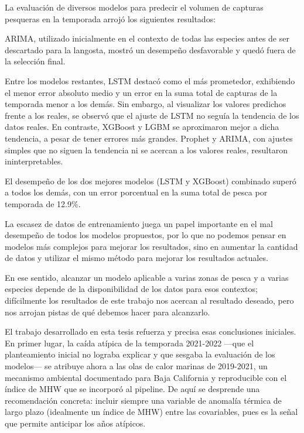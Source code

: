 La evaluación de diversos modelos para predecir el volumen de capturas pesqueras en la temporada arrojó los siguientes resultados:

ARIMA, utilizado inicialmente en el contexto de todas las especies antes de ser descartado para la langosta, mostró un desempeño desfavorable y quedó fuera de la selección final.

Entre los modelos restantes, LSTM destacó como el más prometedor, exhibiendo el menor error absoluto medio y un error en la suma total de capturas de la temporada menor a los demás. Sin embargo, al visualizar los valores predichos frente a los reales, se observó que el ajuste de LSTM no seguía la tendencia de los datos reales. En contraste, XGBoost y LGBM se aproximaron mejor a dicha tendencia, a pesar de tener errores más grandes. Prophet y ARIMA, con ajustes simples que no siguen la tendencia ni se acercan a los valores reales, resultaron ininterpretables. 

El desempeño de los dos mejores modelos (LSTM y XGBoost) combinado superó a todos los demás, con un error porcentual en la suma total de pesca por temporada de 12.9\%. 

La escasez de datos de entrenamiento juega un papel importante en el mal desempeño de todos los modelos propuestos, por lo que no podemos pensar en modelos más complejos para mejorar los resultados, sino en aumentar la cantidad de datos y utilizar el mismo método para mejorar los resultados actuales.

En ese sentido, alcanzar un modelo aplicable a varias zonas de pesca y a varias especies depende de la disponibilidad de los datos para esos contextos; difícilmente los resultados de este trabajo nos acercan al resultado deseado, pero nos arrojan pistas de qué debemos hacer para alcanzarlo.

El trabajo desarrollado en esta tesis refuerza y precisa esas conclusiones iniciales. En primer lugar, la caída atípica de la temporada 2021-2022 —que el planteamiento inicial no lograba explicar y que sesgaba la evaluación de los modelos— se atribuye ahora a las olas de calor marinas de 2019-2021, un mecanismo ambiental documentado para Baja California \citep{villasenor2024} y reproducible con el índice de MHW que se incorporó al pipeline. De aquí se desprende una recomendación concreta: incluir siempre una variable de anomalía térmica de largo plazo (idealmente un índice de MHW) entre las covariables, pues es la señal que permite anticipar los años atípicos.

